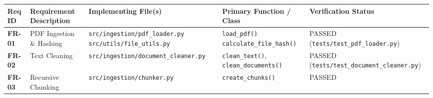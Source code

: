 \documentclass[
]{article}
\begin{document}
\begingroup\scriptsize
\begin{longtable}[]{@{}
  >{\raggedright\arraybackslash\sloppy}p{}
  >{\raggedright\arraybackslash\sloppy}p{}
  >{\raggedright\arraybackslash\sloppy}p{}
  >{\raggedright\arraybackslash\sloppy}p{}
  >{\raggedright\arraybackslash\sloppy}p{}@{}}
\toprule\noalign{}
\begin{minipage}[b]{\linewidth}\raggedright
Req ID
\end{minipage} & \begin{minipage}[b]{\linewidth}\raggedright
Requirement Description
\end{minipage} & \begin{minipage}[b]{\linewidth}\raggedright
Implementing File(s)
\end{minipage} & \begin{minipage}[b]{\linewidth}\raggedright
Primary Function / Class
\end{minipage} & \begin{minipage}[b]{\linewidth}\raggedright
Verification Status
\end{minipage} \\
\midrule\noalign{}
\endhead
\bottomrule\noalign{}
\endlastfoot
\textbf{FR-01} & PDF Ingestion \& Hashing &
\texttt{src/\allowbreak ingestion/\allowbreak pdf\_\allowbreak loader.\allowbreak py}
\newline \texttt{src/\allowbreak utils/\allowbreak file\_\allowbreak utils.\allowbreak py} & \texttt{load\_\allowbreak pdf(\allowbreak )\allowbreak }
\newline \texttt{calculate\_\allowbreak file\_\allowbreak hash(\allowbreak )\allowbreak } & PASSED
(\texttt{tests/\allowbreak test\_\allowbreak pdf\_\allowbreak loader.\allowbreak py}) \\
\textbf{FR-02} & Text Cleaning &
\texttt{src/\allowbreak ingestion/\allowbreak document\_\allowbreak cleaner.\allowbreak py} & \texttt{clean\_\allowbreak text(\allowbreak )\allowbreak },
\texttt{clean\_\allowbreak documents(\allowbreak )\allowbreak } & PASSED
(\texttt{tests/\allowbreak test\_\allowbreak document\_\allowbreak cleaner.\allowbreak py}) \\
\textbf{FR-03} & Recursive Chunking & \texttt{src/\allowbreak ingestion/\allowbreak chunker.\allowbreak py}
& \texttt{create\_\allowbreak chunks(\allowbreak )\allowbreak } & PASSED

\end{longtable}
\end{document}
